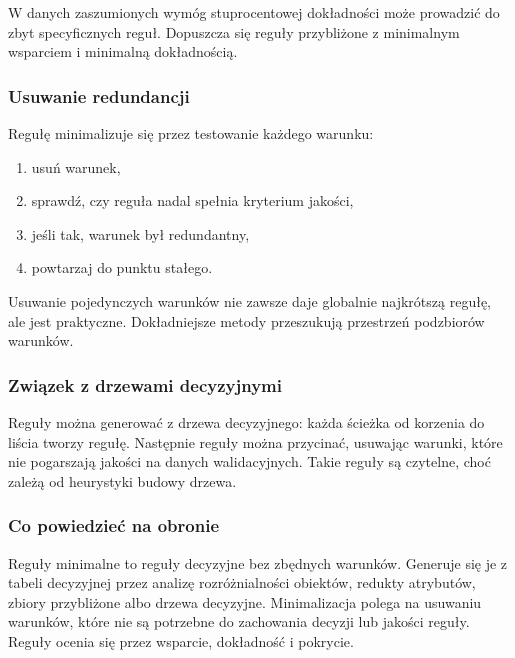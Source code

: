 W danych zaszumionych wymóg stuprocentowej dokładności może prowadzić do zbyt specyficznych reguł. Dopuszcza się reguły przybliżone z minimalnym wsparciem i minimalną dokładnością.

\subsubsection{Usuwanie redundancji}

Regułę minimalizuje się przez testowanie każdego warunku:
\begin{enumerate}
  \item usuń warunek,
  \item sprawdź, czy reguła nadal spełnia kryterium jakości,
  \item jeśli tak, warunek był redundantny,
  \item powtarzaj do punktu stałego.
\end{enumerate}

Usuwanie pojedynczych warunków nie zawsze daje globalnie najkrótszą regułę, ale jest praktyczne. Dokładniejsze metody przeszukują przestrzeń podzbiorów warunków.

\subsubsection{Związek z drzewami decyzyjnymi}

Reguły można generować z drzewa decyzyjnego: każda ścieżka od korzenia do liścia tworzy regułę. Następnie reguły można przycinać, usuwając warunki, które nie pogarszają jakości na danych walidacyjnych. Takie reguły są czytelne, choć zależą od heurystyki budowy drzewa.

\subsubsection{Co powiedzieć na obronie}

Reguły minimalne to reguły decyzyjne bez zbędnych warunków. Generuje się je z tabeli decyzyjnej przez analizę rozróżnialności obiektów, redukty atrybutów, zbiory przybliżone albo drzewa decyzyjne. Minimalizacja polega na usuwaniu warunków, które nie są potrzebne do zachowania decyzji lub jakości reguły. Reguły ocenia się przez wsparcie, dokładność i pokrycie.
